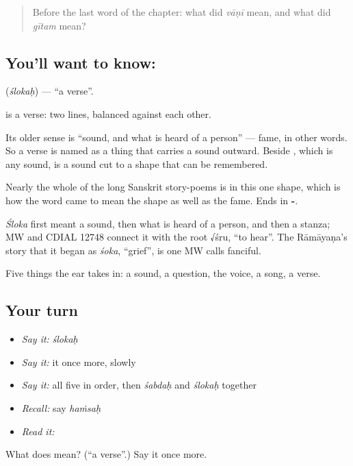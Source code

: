 \label{lesson:SA-C50-verse}



\begin{quote}
Before the last word of the chapter: what did \emph{vāṇī} mean, and what did \emph{gītam} mean?
\end{quote}

\subsection*{You'll want to know: }
\textbf{} (\emph{ślokaḥ}) — \textquotedblleft{}a verse\textquotedblright{}.

\textbf{} is a verse: two lines, balanced against each other.

Its older sense is \textquotedblleft{}sound, and what is heard of a person\textquotedblright{} — fame, in other words. So a verse is named as a thing that carries a sound outward. Beside , which is any sound, \textbf{} is a sound cut to a shape that can be remembered.

Nearly the whole of the long Sanskrit story-poems is in this one shape, which is how the word came to mean the shape as well as the fame. Ends in \textbf{-}.

\begin{cousinweb}
\emph{Śloka} first meant a sound, then what is heard of a person, and then a stanza; MW and CDIAL 12748 connect it with the root √śru, \textquotedblleft{}to hear\textquotedblright{}. The Rāmāyaṇa's story that it began as \emph{śoka}, \textquotedblleft{}grief\textquotedblright{}, is one MW calls fanciful.
\end{cousinweb}

\begin{grammarlens}[title={What you've built}]
Five things the ear takes in: a sound, a question, the voice, a song, a verse.
\end{grammarlens}

\subsection*{Your turn}
\begin{itemize}
\raggedright
  \item \emph{Say it:} \emph{ślokaḥ}
  \item \emph{Say it:} it once more, slowly
  \item \emph{Say it:} all five in order, then \emph{śabdaḥ} and \emph{ślokaḥ} together
  \item \emph{Recall:} say \emph{haṁsaḥ}
  \item \emph{Read it:} \textbf{}
\end{itemize}

\begin{tcolorbox}[breakable,colback=teal!4,colframe=teal!35!black,title={Before you move on}]
What does  mean? (\textquotedblleft{}a verse\textquotedblright{}.) Say it once more.
\end{tcolorbox}
